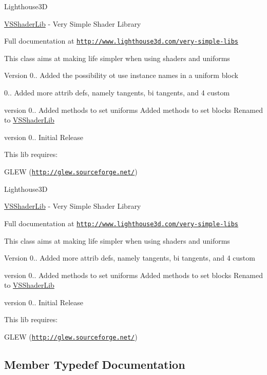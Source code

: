 Lighthouse3D

\hyperlink{class_v_s_shader_lib}{V\+S\+Shader\+Lib} -\/ Very Simple Shader Library

Full documentation at \href{http://www.lighthouse3d.com/very-simple-libs}{\tt http\+://www.\+lighthouse3d.\+com/very-\/simple-\/libs}

This class aims at making life simpler when using shaders and uniforms

\begin{DoxyVersion}{Version}
0.. Added the possibility ot use instance names in a uniform block 

0.. Added more attrib defs, namely tangents, bi tangents, and 4 custom
\end{DoxyVersion}
version 0.. Added methods to set uniforms Added methods to set blocks Renamed to \hyperlink{class_v_s_shader_lib}{V\+S\+Shader\+Lib}

version 0.. Initial Release

This lib requires\+:

G\+L\+EW (\href{http://glew.sourceforge.net/}{\tt http\+://glew.\+sourceforge.\+net/}) 







Lighthouse3D

\hyperlink{class_v_s_shader_lib}{V\+S\+Shader\+Lib} -\/ Very Simple Shader Library

Full documentation at \href{http://www.lighthouse3d.com/very-simple-libs}{\tt http\+://www.\+lighthouse3d.\+com/very-\/simple-\/libs}

This class aims at making life simpler when using shaders and uniforms

\begin{DoxyVersion}{Version}
0.. Added more attrib defs, namely tangents, bi tangents, and 4 custom
\end{DoxyVersion}
version 0.. Added methods to set uniforms Added methods to set blocks Renamed to \hyperlink{class_v_s_shader_lib}{V\+S\+Shader\+Lib}

version 0.. Initial Release

This lib requires\+:

G\+L\+EW (\href{http://glew.sourceforge.net/}{\tt http\+://glew.\+sourceforge.\+net/}) 

 

\subsection{Member Typedef Documentation}
\mbox{\label{class_v_s_shader_lib_a0543003357c93b57bfe99a9aa3e0898d}} 
